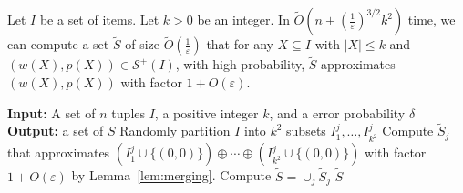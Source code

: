 \documentclass[a4paper,UKenglish,cleveref, autoref, thm-restate, pdfa]{lipics-v2021}
\newcommand{\eps}{\varepsilon}
\renewcommand{\leq}{\leqslant}
\begin{document}
\begin{lemma}\label{lem:secend-layer-color-coding-algorithm}
    Let $I$ be a set of items. Let $k>0$ be an integer. In $\tilde{O}(n + (\frac{1}{\eps})^{3/2}k^2)$ time, we can compute a set $\tilde{S}$ of size $\tilde{O}(\frac{1}{\eps})$ that for any $X \subseteq I$ with $|X| \leq k$ and $(w(X),p(X))\in \mathcal{S}^+(I)$, with high probability, $\tilde{S}$ approximates $(w(X), p(X))$ with factor $1 + O(\eps)$.
\end{lemma}
\begin{algorithm}
\caption{$\mathtt{ColorCoding}(I, k, q)$~\cite{Bri17}}
\label{alg:color-coding}
    \begin{algorithmic}[1]
    \Statex \textbf{Input:} A set of $n$ tuples $I$, a positive integer $k$, and a error probability $\delta$
    \Statex \textbf{Output:} a set of $S$
           \State Randomly partition $I$ into $k^2$ subsets $I^j_1, \ldots, I^j_{k^2}$\;
           \State Compute $\tilde{S}_j$ that approximates $(I^j_1\cup\{(0,0)\}) \oplus \cdots \oplus (I^j_{k^2}\cup\{(0,0)\})$ with factor $1+O(\eps)$ by Lemma~\ref{lem:merging}.
        \EndFor
        \State Compute $\tilde{S} = \cup_j \tilde{S}_j$
  \State \Return $\tilde{S}$
  \end{algorithmic}
\end{algorithm}
\end{document}
